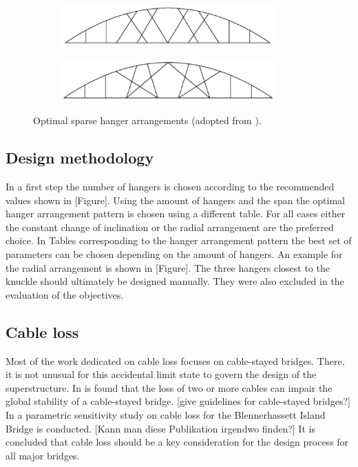 \begin{figure}[H]
\centering
\begin{subfigure}{0.5\textwidth}
    \centering
    \includegraphics[width=0.9\textwidth]{Pictures/Tan 1.PNG}
\end{subfigure}%
\begin{subfigure}{.5\textwidth}
    \centering
    \includegraphics[width=0.9\textwidth]{Pictures/Tan 2.PNG}
\end{subfigure}
\caption{Optimal sparse hanger arrangements (adopted from \cite{Tan}).}
\label{fig:Tan}
\end{figure}



\subsection{Design methodology} \label{sec:rev_meth}

In a first step the number of hangers is chosen according to the recommended values shown in [Figure]. Using the amount of hangers and the span the optimal hanger arrangement pattern is chosen using a different table. For all cases either the constant change of inclination or the radial arrangement are the preferred choice. In Tables corresponding to the hanger arrangement pattern the best set of parameters can be chosen depending on the amount of hangers. An example for the radial arrangement is shown in [Figure]. The three hangers closest to the knuckle should ultimately be designed manually. They were also excluded in the evaluation of the objectives.

\subsection{Cable loss} \label{sec:rev_cable}
Most of the work dedicated on cable loss focuses on cable-stayed bridges. There, it is not unusual for this accidental limit state to govern the design of the superstructure. In \citep{Wolff} is found that the loss of two or more cables can impair the global stability of a cable-stayed bridge.
[give guidelines for cable-stayed bridges?]
In \citep{Zoli} a parametric sensitivity study on cable loss for the Blennerhassett Island Bridge is conducted. [Kann man diese Publikation irgendwo finden?]
It is concluded that cable loss should be a key consideration for the design process for all major bridges.\\

